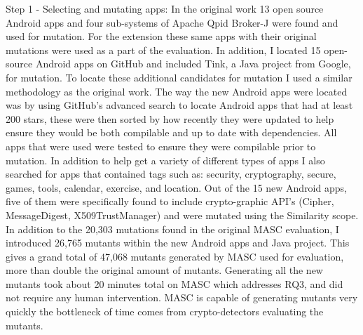 Step 1 - Selecting and mutating apps: In the original work 13 open source Android apps and four sub-systems of Apache Qpid Broker-J were found and used for mutation. For the extension these same apps with their original mutations were used as a part of the evaluation. In addition, I located 15 open-source Android apps on GitHub and included Tink, a Java project from Google, for mutation. To locate these additional candidates for mutation I used a similar methodology as the original work. The way the new Android apps were located was by using GitHub's advanced search to locate Android apps that had at least 200 stars, these were then sorted by how recently they were updated to help ensure they would be both compilable and up to date with dependencies. All apps that were used were tested to ensure they were compilable prior to mutation. In addition to help get a variety of different types of apps I also searched for apps that contained tags such as: security, cryptography, secure, games, tools, calendar, exercise, and location. Out of the 15 new Android apps, five of them were specifically found to include crypto-graphic API's (Cipher, MessageDigest, X509TrustManager) and were mutated using the Similarity scope. In addition to the 20,303 mutations found in the original MASC evaluation, I introduced 26,765 mutants within the new Android apps and Java project. This gives a grand total of 47,068 mutants generated by MASC used for evaluation, more than double the original amount of mutants. Generating all the new mutants took about 20 minutes total on MASC which addresses RQ3, and did not require any human intervention. MASC is capable of generating mutants very quickly the bottleneck of time comes from crypto-detectors evaluating the mutants.

